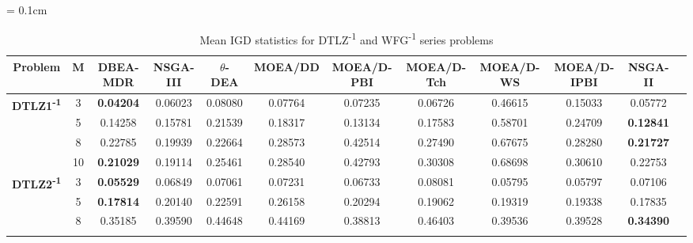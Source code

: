 \documentclass{sig-alternate}
\begin{document}
\begin{table}[!htb]\scriptsize
	\centering
	\renewcommand{\arraystretch}{0.9}
	\caption{Mean IGD statistics for DTLZ\textsuperscript{-1} and WFG\textsuperscript{-1} series problems}
	\label{tab:IGDminus}
	\tabcolsep = 0.1cm
	\begin{tabular}{|c|c|c|c|c|c|c|c|c|c|c|c|}
		\noalign{\smallskip}\hline
		\textbf{Problem}                                      & \textbf{M} & \textbf{DBEA-MDR} & \textbf{NSGA-III} & \textbf{$\theta$-DEA} & \textbf{MOEA/DD} & \textbf{MOEA/D-PBI} & \textbf{MOEA/D-Tch} & \textbf{MOEA/D-WS} & \textbf{MOEA/D-IPBI} & \textbf{NSGA-II} \\ \hline
\multirow{4}{*}{\textbf{DTLZ1\textsuperscript{-1}}} & 3          & \textbf{0.04204} & 0.06023           & 0.08080               & 0.07764          & 0.07235             & 0.06726             & 0.46615            & 0.15033              & 0.05772          \\ \cline{2-11} 
                                                      & 5          & 0.14258          & 0.15781           & 0.21539               & 0.18317          & 0.13134             & 0.17583             & 0.58701            & 0.24709              & \textbf{0.12841} \\ \cline{2-11} 
                                                      & 8          & 0.22785          & 0.19939           & 0.22664               & 0.28573          & 0.42514             & 0.27490             & 0.67675            & 0.28280              & \textbf{0.21727} \\ \cline{2-11} 
                                                      & 10         & \textbf{0.21029} & 0.19114           & 0.25461               & 0.28540          & 0.42793             & 0.30308             & 0.68698            & 0.30610              & 0.22753          \\ \hline
\multirow{4}{*}{\textbf{DTLZ2\textsuperscript{-1}}} & 3          & \textbf{0.05529} & 0.06849           & 0.07061               & 0.07231          & 0.06733             & 0.08081             & 0.05795            & 0.05797              & 0.07106          \\ \cline{2-11} 
                                                      & 5          & \textbf{0.17814} & 0.20140           & 0.22591               & 0.26158          & 0.20294             & 0.19062             & 0.19319            & 0.19338              & 0.17835          \\ \cline{2-11} 
                                                      & 8          & 0.35185          & 0.39590           & 0.44648               & 0.44169          & 0.38813             & 0.46403             & 0.39536            & 0.39528              & \textbf{0.34390} \\ \cline{2-11} 

\end{tabular}
\end{table}
\end{document}
